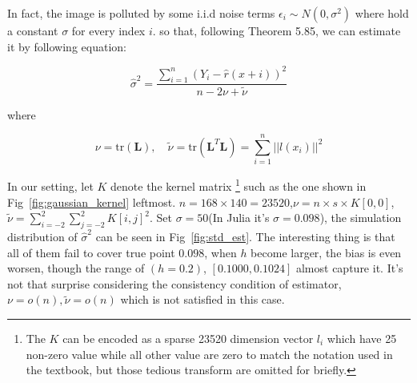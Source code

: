 \documentclass{article}
\begin{document}
In fact, the image is polluted by some i.i.d noise terms $\epsilon_i \sim N(0,\sigma^2)$ where hold a constant $\sigma$ for every index $i$.
so that, following \cite{wasserman2006all} Theorem 5.85, we can estimate it by following equation:

$$
\hat{\sigma}^2=\frac{\sum_{i=1}^n (Y_i-\hat{r}(x+i))^2}{n-2\nu+\tilde{\nu}}
$$

where

$$
\nu = \mathrm{tr}(\mathbf{L}), \quad 
\tilde{\nu}=\mathrm{tr}(\mathbf{L}^T\mathbf{L})=\sum_{i=1}^n||l(x_i)||^2
$$

In our setting, let $K$ denote the kernel matrix
\footnote{The $K$ can be encoded as a sparse 23520 dimension vector $l_i$ which have 25 non-zero value while all other value are zero to match
the notation used in the textbook, but those tedious transform are omitted for briefly.}
such as the one shown in Fig~\ref{fig:gaussian_kernel} leftmost.
$n = 168 \times 140 = 23520$,$\nu = n \times s \times K[0,0]$,
$\tilde{\nu} = \sum_{i=-2}^2\sum_{j=-2}^2 K[i,j]^2$. 
Set $\sigma=50$(In Julia it's $\sigma=0.098$), 
the simulation distribution of $\hat{\sigma}^2$ can be seen in Fig~\ref{fig:std_est}. 
The interesting thing is that all of them fail to cover true point $0.098$, when $h$ become larger,
the bias is even worsen, though the range of $(h=0.2)$, $[0.1000,0.1024]$ almost capture it.
It's not that surprise considering the consistency condition of estimator, 
$\nu=o(n),\tilde{\nu}=o(n)$ which is not satisfied in this case.
\end{document}
